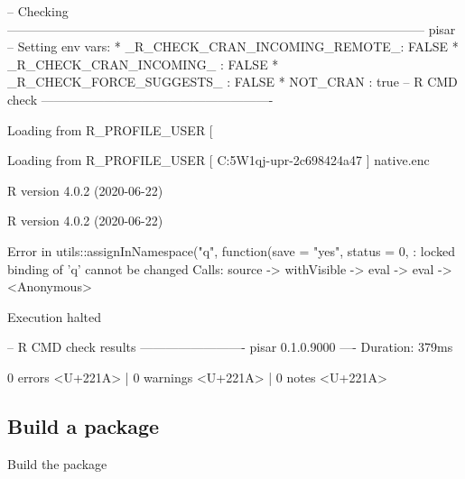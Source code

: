 \documentclass[a4paper,12pt]{article}\usepackage[]{graphicx}\usepackage[]{color}
\begin{document}
\begin{Schunk}
\begin{Soutput}
  
   

-- Checking --------------------------------------------------------------------------------------------------- pisar --
Setting env vars:
* _R_CHECK_CRAN_INCOMING_REMOTE_: FALSE
* _R_CHECK_CRAN_INCOMING_       : FALSE
* _R_CHECK_FORCE_SUGGESTS_      : FALSE
* NOT_CRAN                      : true
-- R CMD check -------------------------------------------------------
  
Loading from R_PROFILE_USER [
  
   Loading from R_PROFILE_USER [ C:\Users\ablejec\AppData\Local\Temp\Rtmps5W1qj\callr-upr-2c698424a47 ]
   native.enc 

  
R version 4.0.2 (2020-06-22)
  
   R version 4.0.2 (2020-06-22) 

  
   Error in utils::assignInNamespace("q", function(save = "yes", status = 0,  : 
     locked binding of 'q' cannot be changed
   Calls: source -> withVisible -> eval -> eval -> <Anonymous>

  
   Execution halted


\end{Soutput}
\begin{Soutput}
-- R CMD check results ------------------------- pisar 0.1.0.9000 ----
Duration: 379ms

0 errors <U+221A> | 0 warnings <U+221A> | 0 notes <U+221A>
\end{Soutput}
\end{Schunk}
\clearpage
\subsection{Build a package}

Build the package
\end{document}
